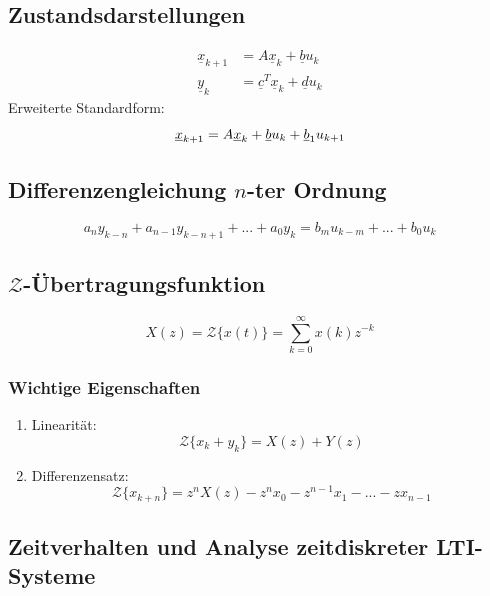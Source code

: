\documentclass[a4paper,twocolumn,10pt]{article}
\begin{document}
\subsection{Zustandsdarstellungen}
\begin{equation*}
\begin{split}
\underline{x}_{k+1}&=A\underline{x}_k+\underline{b}u_k\\
\underline{y}_k&=\underline{c}^T\underline{x}_k+\underline{d}u_k
\end{split}
\end{equation*}
Erweiterte Standardform:
\begin{equation*}
\underline{x}_{k+1}=A\underline{x}_k+\underline{b}u_k+\underline{b}_1u_{k+1}\\
\end{equation*}

\subsection{Differenzengleichung $n$-ter Ordnung}
\begin{equation*}
a_ny_{k-n}+a_{n-1}y_{k-n+1}+...+a_0y_k=b_mu_{k-m}+...+b_0u_k
\end{equation*}

\subsection{$\mathcal{Z}$-Übertragungsfunktion}
\begin{equation*}
X(z)=\mathcal{Z}\{x(t)\}=\sum\limits_{k=0}^{\infty}x(k)z^{-k}
\end{equation*}

\subsubsection{Wichtige Eigenschaften}
\begin{enumerate}[label=$\bullet$]
\item Linearität:
\begin{equation*}
\mathcal{Z}\{x_k+y_k\}=X(z)+Y(z)
\end{equation*}
\item Differenzensatz:
\begin{equation*}
\mathcal{Z}\{x_{k+n}\}=z^nX(z)-z^nx_0-z^{n-1}x_1-...-zx_{n-1}
\end{equation*}
\end{enumerate}

\subsection{Zeitverhalten und Analyse zeitdiskreter LTI-Systeme}
\end{document}
